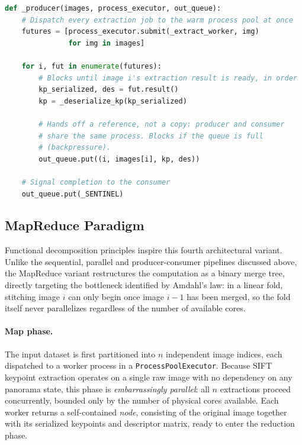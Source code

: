 \documentclass[10pt,twocolumn,letterpaper]{article}
\begin{document}
\begin{lstlisting}[language=Python, basicstyle=\footnotesize\ttfamily, breaklines=true, frame=single, breakatwhitespace=true, xrightmargin=1em, caption={Producer thread: extraction dispatch and handoff via a bounded queue.}, label={lst:producer-consumer}]
def _producer(images, process_executor, out_queue):
    # Dispatch every extraction job to the warm process pool at once
    futures = [process_executor.submit(_extract_worker, img)
               for img in images]

    for i, fut in enumerate(futures):
        # Blocks until image i's extraction result is ready, in order
        kp_serialized, des = fut.result()
        kp = _deserialize_kp(kp_serialized)

        # Hands off a reference, not a copy: producer and consumer
        # share the same process. Blocks if the queue is full
        # (backpressure).
        out_queue.put((i, images[i], kp, des))

    # Signal completion to the consumer
    out_queue.put(_SENTINEL)
\end{lstlisting}

\subsection{MapReduce Paradigm}

Functional decomposition principles inspire this fourth architectural variant. Unlike the
sequential, parallel and producer-consumer pipelines discussed above,
 the MapReduce variant restructures the
computation as a binary merge tree, directly targeting the bottleneck identified by
Amdahl's law: in a linear fold, stitching image $i$ can only begin once image $i-1$ has been
merged, so the fold itself never parallelizes regardless of the number of available cores.

\paragraph{Map phase.}
The input dataset is first partitioned into $n$ independent image indices, each dispatched to
a worker process in a \texttt{ProcessPoolExecutor}. Because SIFT keypoint extraction operates
on a single raw image with no dependency on any panorama state, this phase is
\emph{embarrassingly parallel}: all $n$ extractions proceed concurrently, bounded only by the
number of physical cores available. Each worker returns a self-contained \emph{node}, consisting of
the original image together with its serialized keypoints and descriptor matrix, ready to
enter the reduction phase.
\end{document}
